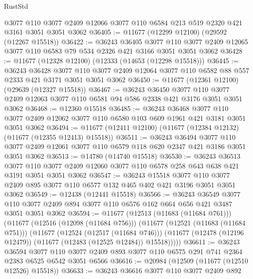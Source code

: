 \begin{lexlean}{RustStd}
\begin{coremodule}
    @3077
    @110
    @3077
    @2409
    @12066
    @3077
    @110
    @6584
    @213
    @519
    @2320
    @421
    @3161
    @3051
    @3051
    @3062
@36405 := @11677 (@12299 @12100) (@29592 (@12267 @15518))
@36422 := @36243
    @36405
    @3077
    @110
    @3077
    @2409
    @12065
    @3077
    @110
    @6583
    @79
    @534
    @2326
    @421
    @3166
    @3051
    @3051
    @3062
@36428 := @11677 (@12328 @12100) (@12333 (@14653 (@12298 @15518)))
@36445 := @36243
    @36428
    @3077
    @110
    @3077
    @2409
    @12064
    @3077
    @110
    @6582
    @88
    @557
    @2333
    @421
    @3171
    @3051
    @3051
    @3062
@36450 := @11677 (@12361 @12100) (@29639 (@12327 @15518))
@36467 := @36243
    @36450
    @3077
    @110
    @3077
    @2409
    @12063
    @3077
    @110
    @6581
    @94
    @586
    @2338
    @421
    @3176
    @3051
    @3051
    @3062
@36468 := @12360 @15518
@36485 := @36243
    @36468
    @3077
    @110
    @3077
    @2409
    @12062
    @3077
    @110
    @6580
    @103
    @609
    @1961
    @421
    @3181
    @3051
    @3051
    @3062
@36494 := @11677 (@12411 @12100) (@11677 (@12384 @12132) (@11677 (@12355 @12413) @15518))
@36511 := @36243
    @36494
    @3077
    @110
    @3077
    @2409
    @12061
    @3077
    @110
    @6579
    @118
    @620
    @2347
    @421
    @3186
    @3051
    @3051
    @3062
@36513 := @14780 (@14740 @15518)
@36530 := @36243
    @36513
    @3077
    @110
    @3077
    @2409
    @12060
    @3077
    @110
    @6578
    @258
    @643
    @638
    @421
    @3191
    @3051
    @3051
    @3062
@36547 := @36243
    @15518
    @3077
    @110
    @3077
    @2409
    @895
    @3077
    @110
    @6577
    @132
    @465
    @402
    @421
    @3196
    @3051
    @3051
    @3062
@36549 := @12438 (@12441 @15518)
@36566 := @36243
    @36549
    @3077
    @110
    @3077
    @2409
    @894
    @3077
    @110
    @6576
    @162
    @664
    @656
    @421
    @3487
    @3051
    @3051
    @3062
@36594 := @11677
    (@12513 (@11683 (@11684 @761)))
    (@11677
      (@12516 (@12098 (@11684 @756)))
      (@11677
        (@12521 (@11683 (@11684 @751)))
        (@11677
          (@12524 (@12517 (@11684 @746)))
          (@11677 (@12478 (@12196 @12479)) (@11677 (@12483 (@12525 @12484)) @15518)))))
@36611 := @36243
    @36594
    @3077
    @110
    @3077
    @2409
    @893
    @3077
    @110
    @6575
    @291
    @741
    @2364
    @2383
    @6525
    @6542
    @3051
    @6566
@36616 := @20984 (@12509 (@11677 (@12510 @12526) @15518))
@36633 := @36243
    @36616
    @3077
    @110
    @3077
    @2409
    @892

\end{coremodule}
\end{lexlean}
